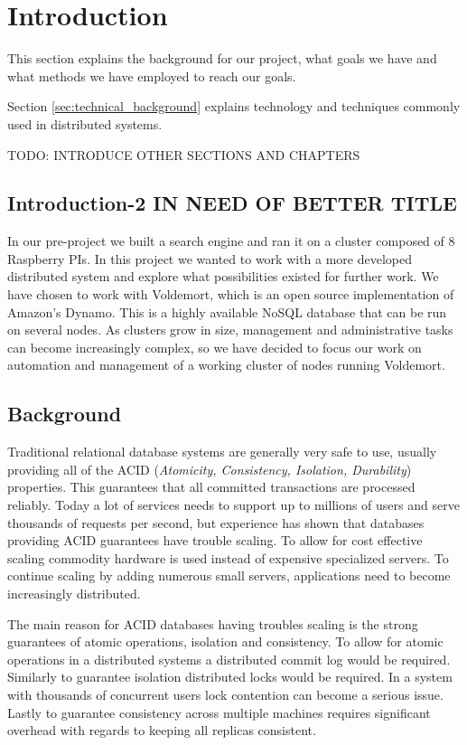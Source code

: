 
\section{Introduction}
This section explains the background for our project, what goals we have and what methods we have employed to reach our goals. 

Section \ref{sec:technical_background} explains technology and techniques commonly used in distributed systems.

TODO: INTRODUCE OTHER SECTIONS AND CHAPTERS

\subsection{Introduction-2 IN NEED OF BETTER TITLE}
In our pre-project we built a search engine and ran it on a cluster composed of 8 Raspberry PIs. In this project we wanted to work with a more developed distributed system and explore what possibilities existed for further work. We have chosen to work with Voldemort, which is an open source implementation of Amazon’s Dynamo. This is a highly available NoSQL database that can be run on several nodes. As clusters grow in size, management and administrative tasks can become increasingly complex, so we have decided to focus our work on automation and management of a working cluster of nodes running Voldemort. 

\subsection{Background}
Traditional relational database systems are generally very safe to use, usually providing all of the ACID (\emph{Atomicity, Consistency, Isolation, Durability}) properties.
This guarantees that all committed transactions are processed reliably. 
Today a lot of services needs to support up to millions of users and serve thousands of requests per second, but experience has shown that databases providing ACID guarantees have trouble scaling. 
To allow for cost effective scaling commodity hardware is used instead of expensive specialized servers. To continue scaling by adding numerous small servers, applications need to become increasingly distributed.

The main reason for ACID databases having troubles scaling is the strong guarantees of atomic operations, isolation and consistency. 
To allow for atomic operations in a distributed systems a distributed commit log would be required. 
Similarly to guarantee isolation distributed locks would be required. In a system with thousands of concurrent users lock contention can become a serious issue. 
Lastly to guarantee consistency across multiple machines requires significant overhead with regards to keeping all replicas consistent. 

